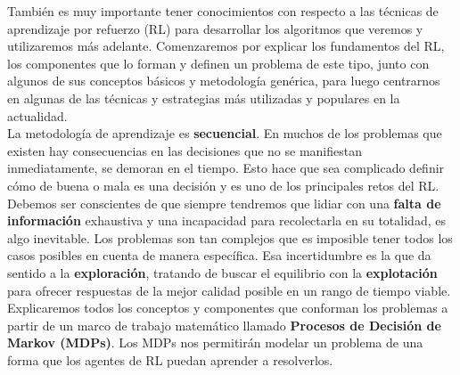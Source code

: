 \documentclass[11pt,fleqn]{book} %
\begin{document}
También es muy importante tener conocimientos con respecto a las técnicas de aprendizaje por refuerzo (RL) para desarrollar los algoritmos que veremos y utilizaremos más adelante. Comenzaremos por explicar los fundamentos del RL, los componentes que lo forman y definen un problema de este tipo, junto con algunos de sus conceptos básicos y metodología genérica, para luego centrarnos en algunas de las técnicas y estrategias más utilizadas y populares en la actualidad. \\


La metodología de aprendizaje es \textbf{secuencial}. En muchos de los problemas que existen hay consecuencias en las decisiones que no se manifiestan inmediatamente, se demoran en el tiempo. Esto hace que sea complicado definir cómo de buena o mala es una decisión y es uno de los principales retos del RL. \\

Debemos ser conscientes de que siempre tendremos que lidiar con una \textbf{falta de información} exhaustiva y una incapacidad para recolectarla en su totalidad, es algo inevitable. Los problemas son tan complejos que es imposible tener todos los casos posibles en cuenta de manera específica. Esa incertidumbre es la que da sentido a la \textbf{exploración}, tratando de buscar el equilibrio con la \textbf{explotación} para ofrecer respuestas de la mejor calidad posible en un rango de tiempo viable.\\

Explicaremos todos los conceptos y componentes que conforman los problemas a partir de un marco de trabajo matemático llamado \textbf{Procesos de Decisión de Markov (MDPs)}. Los MDPs nos permitirán modelar un problema de una forma que los agentes de RL puedan aprender a resolverlos. \cite{book:miguel} \cite{article:RLromero} \cite{book:barto}  \\ 

\end{document}
